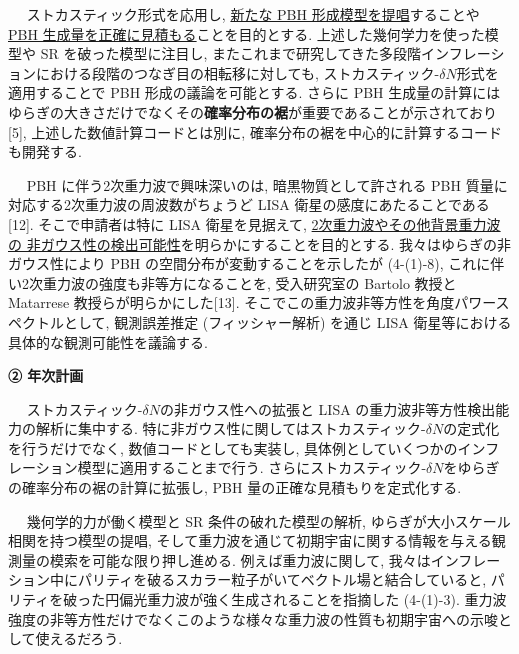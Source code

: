 \documentclass[11pt,a4paper,uplatex,twoside,dvipdfmx]{ujarticle} 	%
\renewcommand{\emph}[1]{{\sffamily\gtfamily\bfseries #1}}
\newcommand{\subject}[1]{\noindent{\sffamily\gtfamily\bfseries #1}~~}
\newcommand{\研究課題名}{\mgfamily ストカスティック形式、原始ブラックホール、重力波観測から迫るインフレーション}
\newcommand{\研究機関名}{\mgfamily 名古屋大学}
\newcommand{\申請者氏名}{\mgfamily 多田 祐一郎}
\newcommand{\研究代表者氏名}{\申請者氏名}
\newcommand{\研究期間の最終元号年度}{34}	%
\begin{document}
{	
	\vspace{3pt}
	\subject{2. PBH}
	ストカスティック形式を応用し, \ul{新たな PBH 形成模型を提唱}することや \ul{PBH 生成量を正確に見積もる}ことを目的とする.
	上述した幾何学力を使った模型や SR を破った模型に注目し,
	またこれまで研究してきた多段階インフレーションにおける段階のつなぎ目の相転移に対しても, 
	ストカスティック-$\delta N$形式を適用することで PBH 形成の議論を可能とする.
	さらに PBH 生成量の計算にはゆらぎの大きさだけでなくその\emph{確率分布の裾}が重要であることが示されており[5],
	上述した数値計算コードとは別に, 確率分布の裾を中心的に計算するコードも開発する.
	
	
	\vspace{3pt}
	\subject{3. 重力波}
	PBH に伴う2次重力波で興味深いのは, 暗黒物質として許される PBH 質量に対応する2次重力波の周波数がちょうど LISA 衛星の感度にあたることである[12].
	そこで申請者は特に LISA 衛星を見据えて, \ul{2次重力波やその他背景重力波の
	非ガウス性の検出可能性}を明らかにすることを目的とする.
	我々はゆらぎの非ガウス性により PBH の空間分布が変動することを示したが (4-(1)-8),
	これに伴い2次重力波の強度も非等方になることを, 受入研究室の Bartolo 教授と Matarrese 教授らが明らかにした[13].
	そこでこの重力波非等方性を角度パワースペクトルとして,
	観測誤差推定 (フィッシャー解析) を通じ LISA 衛星等における具体的な観測可能性を議論する.
	
	
	
	
	
	\begin{mdframed}[roundcorner=0.5zw,
	innertopmargin=0.8zw,innerbottommargin=0.8zw,
	linecolor=black!50,linewidth=0.2zw,
	backgroundcolor=black!10]
	{\bfseries\gtfamily\sffamily\large ② 年次計画}
	\end{mdframed}
	
	\vspace{-10pt}
	\subject{1年目}
	ストカスティック-$\delta N$の非ガウス性への拡張と LISA の重力波非等方性検出能力の解析に集中する.
	特に非ガウス性に関してはストカスティック-$\delta N$の定式化を行うだけでなく, 数値コードとしても実装し,
	具体例としていくつかのインフレーション模型に適用することまで行う.
	さらにストカスティック-$\delta N$をゆらぎの確率分布の裾の計算に拡張し, PBH 量の正確な見積もりを定式化する.
		
	
	\vspace{3pt}
	\subject{2年目}
	幾何学的力が働く模型と SR 条件の破れた模型の解析,
	ゆらぎが大小スケール相関を持つ模型の提唱, そして重力波を通じて初期宇宙に関する情報を与える観測量の模索を可能な限り押し進める.
	例えば重力波に関して, 我々はインフレーション中にパリティを破るスカラー粒子がいてベクトル場と結合していると, パリティを破った円偏光重力波が強く生成されることを指摘した (4-(1)-3).
	重力波強度の非等方性だけでなくこのような様々な重力波の性質も初期宇宙への示唆として使えるだろう.
	
}
\end{document}
